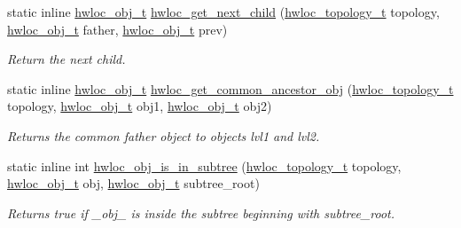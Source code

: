 \begin{DoxyCompactItemize}
static inline \hyperlink{structhwloc__obj}{hwloc\_\-obj\_\-t} \hyperlink{group__hwlocality__helper__traversal__basic_ga3727d1e62843468ad3796fae52881512}{hwloc\_\-get\_\-next\_\-child} (\hyperlink{group__hwlocality__topology_ga9d1e76ee15a7dee158b786c30b6a6e38}{hwloc\_\-topology\_\-t} topology, \hyperlink{structhwloc__obj}{hwloc\_\-obj\_\-t} father, \hyperlink{structhwloc__obj}{hwloc\_\-obj\_\-t} prev)
\begin{DoxyCompactList}\small\item\em Return the next child. \item\end{DoxyCompactList}\item 
static inline \hyperlink{structhwloc__obj}{hwloc\_\-obj\_\-t} \hyperlink{group__hwlocality__helper__traversal__basic_ga58ba3d31ed79e7a1a47909824489d317}{hwloc\_\-get\_\-common\_\-ancestor\_\-obj} (\hyperlink{group__hwlocality__topology_ga9d1e76ee15a7dee158b786c30b6a6e38}{hwloc\_\-topology\_\-t} topology, \hyperlink{structhwloc__obj}{hwloc\_\-obj\_\-t} obj1, \hyperlink{structhwloc__obj}{hwloc\_\-obj\_\-t} obj2)
\begin{DoxyCompactList}\small\item\em Returns the common father object to objects lvl1 and lvl2. \item\end{DoxyCompactList}\item 
static inline int \hyperlink{group__hwlocality__helper__traversal__basic_ga810bf401a37f879f864aa1ab9d10b12f}{hwloc\_\-obj\_\-is\_\-in\_\-subtree} (\hyperlink{group__hwlocality__topology_ga9d1e76ee15a7dee158b786c30b6a6e38}{hwloc\_\-topology\_\-t} topology, \hyperlink{structhwloc__obj}{hwloc\_\-obj\_\-t} obj, \hyperlink{structhwloc__obj}{hwloc\_\-obj\_\-t} subtree\_\-root)
\begin{DoxyCompactList}\small\item\em Returns true if \_\-obj\_\- is inside the subtree beginning with {\ttfamily subtree\_\-root}. \item\end{DoxyCompactList}\end{DoxyCompactItemize}


